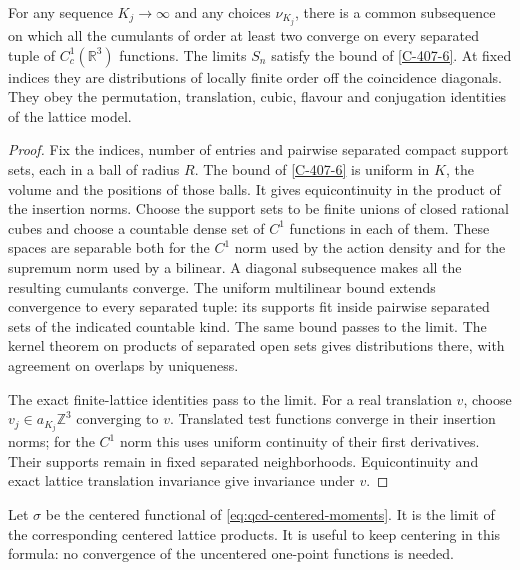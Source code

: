 \documentclass[11pt,letterpaper,reqno]{amsart}
\makeatletter
\theoremstyle{definition}
\newcommand{\ms@minorstart}{%
  \pushQED{\qed}\renewcommand{\qedsymbol}{$\blacksquare$}}
\newenvironment{proposition}[1][]{\ms@minorstart\ms@proposition[#1]}
  {\popQED\endms@proposition}
\theoremstyle{remark}
\makeatother
\begin{document}
\begin{proposition}[Compactness on separated supports]\label{C-389-25}
For any sequence $K_j\to\infty$ and any choices $\nu_{K_j}$,
there is a common subsequence on which all the cumulants of
order at least two converge on every separated tuple of
$C_c^1(\mathbb R^3)$ functions. The limits $S_n$ satisfy
the bound of \cref{C-407-6}. At fixed indices they are
distributions of locally finite order off the coincidence
diagonals. They obey the permutation, translation, cubic,
flavour and conjugation identities of the lattice model.
\end{proposition}
\begin{proof}
Fix the indices, number of entries and pairwise separated compact
support sets, each in a ball of radius $R$. The bound of
\cref{C-407-6} is uniform in $K$, the volume and the positions
of those balls. It gives equicontinuity in the product of the
insertion norms. Choose the support sets to be finite unions
of closed rational cubes and choose a countable dense set of
$C^1$ functions in each of them. These spaces are separable
both for the $C^1$ norm used by the action density and for the
supremum norm used by a bilinear. A diagonal subsequence makes
all the resulting cumulants converge. The uniform multilinear
bound extends convergence to every separated tuple: its supports
fit inside pairwise separated sets of the indicated countable
kind. The same bound passes to the limit. The kernel theorem
on products of separated open sets gives distributions there,
with agreement on overlaps by uniqueness.

The exact finite-lattice identities pass to the limit.
For a real translation $v$, choose $v_j\in a_{K_j}\mathbb Z^3$
converging to $v$. Translated test functions converge in their
insertion norms; for the $C^1$ norm this uses uniform continuity
of their first derivatives. Their supports remain in fixed
separated neighborhoods. Equicontinuity and exact lattice
translation invariance give invariance under $v$.
\end{proof}

Let $\sigma$ be the centered functional of
\eqref{eq:qcd-centered-moments}. It is the limit of the
corresponding centered lattice products.
It is useful to keep centering in this formula: no convergence
of the uncentered one-point functions is needed.
\end{document}
